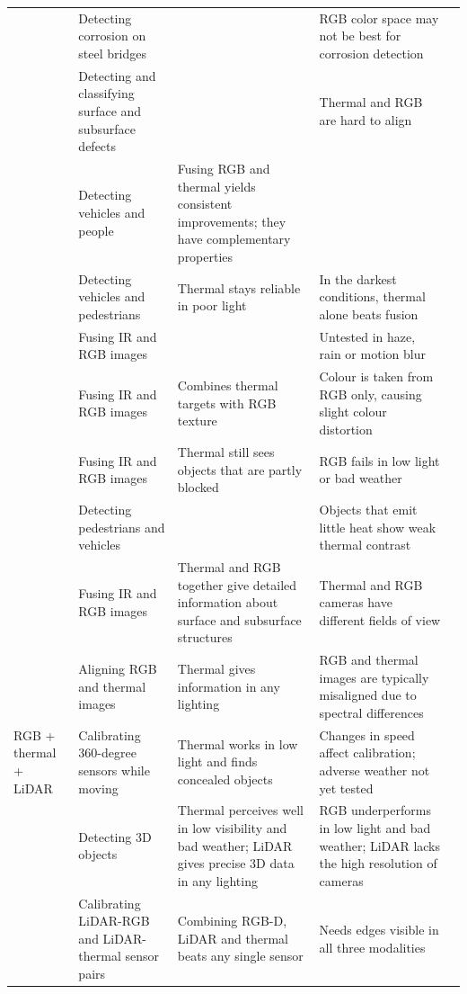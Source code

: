{\begin{xltabular}{\textwidth}{>{\RaggedRight\arraybackslash}p{2.1cm}>{\RaggedRight\arraybackslash}p{2.9cm}>{\RaggedRight\arraybackslash}X>{\RaggedRight\arraybackslash}Xp{0.95cm}}
 & Detecting corrosion on steel bridges &  & RGB color space may not be best for corrosion detection & \citep{Lim2021} \\
 & Detecting and classifying surface and subsurface defects &  & Thermal and RGB are hard to align & \citep{Li2024c} \\
 & Detecting vehicles and people & Fusing RGB and thermal yields consistent improvements; they have complementary properties &  & \citep{Liu2025} \\
 & Detecting vehicles and pedestrians & Thermal stays reliable in poor light & In the darkest conditions, thermal alone beats fusion & \citep{Jiang2024} \\
 & Fusing IR and RGB images &  & Untested in haze, rain or motion blur & \citep{An2026} \\
 & Fusing IR and RGB images & Combines thermal targets with RGB texture & Colour is taken from RGB only, causing slight colour distortion & \citep{Xu2026} \\
 & Fusing IR and RGB images & Thermal still sees objects that are partly blocked & RGB fails in low light or bad weather & \citep{Chen2026a} \\
 & Detecting pedestrians and vehicles &  & Objects that emit little heat show weak thermal contrast & \citep{Wang2026b} \\
 & Fusing IR and RGB images & Thermal and RGB together give detailed information about surface and subsurface structures & Thermal and RGB cameras have different fields of view & \citep{Shahsavarani2024} \\
 & Aligning RGB and thermal images & Thermal gives information in any lighting & RGB and thermal images are typically misaligned due to spectral differences & \citep{Bin2023} \\
\midrule
RGB + thermal + LiDAR & Calibrating 360-degree sensors while moving & Thermal works in low light and finds concealed objects & Changes in speed affect calibration; adverse weather not yet tested & \citep{Tran2024} \\
 & Detecting 3D objects & Thermal perceives well in low visibility and bad weather; LiDAR gives precise 3D data in any lighting & RGB underperforms in low light and bad weather; LiDAR lacks the high resolution of cameras & \citep{Tran2025} \\
 & Calibrating LiDAR-RGB and LiDAR-thermal sensor pairs & Combining RGB-D, LiDAR and thermal beats any single sensor & Needs edges visible in all three modalities & \citep{Yang2024} \\

\end{xltabular}}
